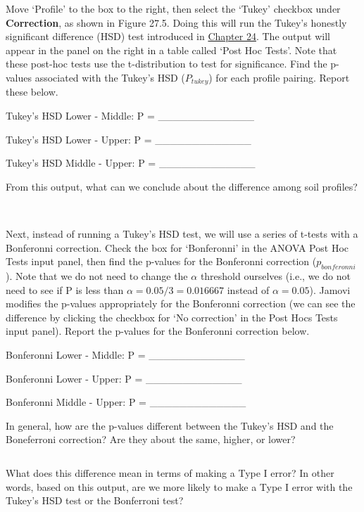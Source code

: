 \documentclass[
]{scrbook}
\begin{document}
Move `Profile' to the box to the right, then select the `Tukey' checkbox under \textbf{Correction}, as shown in Figure 27.5.
Doing this will run the Tukey's honestly significant difference (HSD) test introduced in \protect\hyperlink{Chapter_24}{Chapter 24}.
The output will appear in the panel on the right in a table called `Post Hoc Tests'.
Note that these post-hoc tests use the t-distribution to test for significance.
Find the p-values associated with the Tukey's HSD (\(P_{tukey}\)) for each profile pairing.
Report these below.

Tukey's HSD Lower - Middle: P = \_\_\_\_\_\_\_\_\_\_\_\_\_

Tukey's HSD Lower - Upper: P = \_\_\_\_\_\_\_\_\_\_\_\_\_

Tukey's HSD Middle - Upper: P = \_\_\_\_\_\_\_\_\_\_\_\_\_

From this output, what can we conclude about the difference among soil profiles?

\begin{verbatim}


\end{verbatim}

Next, instead of running a Tukey's HSD test, we will use a series of t-tests with a Bonferonni correction.
Check the box for `Bonferonni' in the ANOVA Post Hoc Tests input panel, then find the p-values for the Bonferonni correction (\(p_{bonferonni}\)).
Note that we do not need to change the \(\alpha\) threshold ourselves (i.e., we do not need to see if P is less than \(\alpha = 0.05/3 = 0.016667\) instead of \(\alpha = 0.05\)).
Jamovi modifies the p-values appropriately for the Bonferonni correction (we can see the difference by clicking the checkbox for `No correction' in the Post Hocs Tests input panel).
Report the p-values for the Bonferonni correction below.

Bonferonni Lower - Middle: P = \_\_\_\_\_\_\_\_\_\_\_\_\_

Bonferonni Lower - Upper: P = \_\_\_\_\_\_\_\_\_\_\_\_\_

Bonferonni Middle - Upper: P = \_\_\_\_\_\_\_\_\_\_\_\_\_

In general, how are the p-values different between the Tukey's HSD and the Boneferroni correction?
Are they about the same, higher, or lower?

\begin{verbatim}
\end{verbatim}

What does this difference mean in terms of making a Type I error?
In other words, based on this output, are we more likely to make a Type I error with the Tukey's HSD test or the Bonferroni test?
\end{document}
